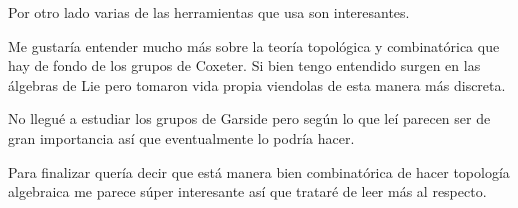 \documentclass[13pt]{scrartcl}
\theoremstyle{plain} %
\theoremstyle{definition}
\theoremstyle{remark}
\begin{document}
	Por otro lado varias de las herramientas que usa son interesantes.
	
	Me gustaría entender mucho más sobre la teoría topológica y combinatórica que hay de fondo de los grupos de Coxeter. Si bien tengo entendido surgen en las álgebras de Lie pero tomaron vida propia viendolas de esta manera más discreta. 
	
	No llegué a estudiar los grupos de Garside pero según lo que leí parecen ser de gran importancia así que eventualmente lo podría hacer.
	
	Para finalizar quería decir que está manera bien combinatórica de hacer topología algebraica me parece súper interesante así que trataré de leer más al respecto.
	
	
	
\end{document}
